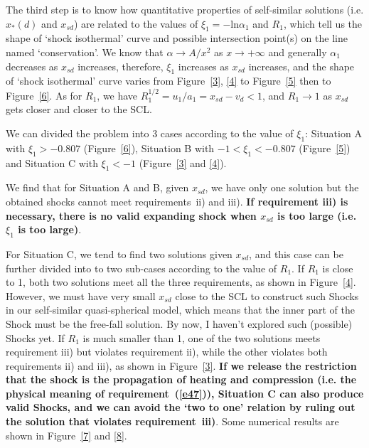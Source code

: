 \documentclass[fleqn,usenatbib]{mnras}
\begin{document}
The third step is to know how quantitative properties of self-similar solutions (i.e. $x_{*}(d)$ and $x_{sd}$) are related to the values of $\xi_{1}=-\mathrm{ln}\alpha_{1}$ and $R_{1}$, which tell us the shape of `shock isothermal' curve and possible intersection point(s) on the line named `conservation'. We know that $\alpha\rightarrow A/x^{2}$ as $x\rightarrow+\infty$ and generally $\alpha_{1}$ decreases as $x_{sd}$ increases, therefore, $\xi_{1}$ increases as $x_{sd}$ increases, and the shape of `shock isothermal' curve varies from Figure~\ref{3}, \ref{4} to Figure~\ref{5} then to Figure~\ref{6}. As for $R_{1}$, we have $R_{1}^{1/2}=u_{1}/a_{1}=x_{sd}-v_{d}<1$, and $R_{1}\rightarrow 1$ as $x_{sd}$ gets closer and closer to the SCL.

We can divided the problem into 3 cases according to the value of $\xi_{1}$: Situation A with $\xi_{1}>-0.807$ (Figure~\ref{6}), Situation B with $-1<\xi_{1}<-0.807$ (Figure~\ref{5}) and Situation C with $\xi_{1}<-1$ (Figure~\ref{3} and \ref{4}). 

We find that for Situation A and B, given $x_{sd}$, we have only one solution but the obtained shocks cannot meet requirements~ii) and iii). \textbf{If requirement iii) is necessary, there is no valid expanding shock when $x_{sd}$ is too large (i.e. $\xi_{1}$ is too large)}. 

For Situation C, we tend to find two solutions given $x_{sd}$, and this case can be further divided into to two sub-cases according to the value of $R_{1}$. If $R_{1}$ is close to 1, both two solutions meet all the three requirements, as shown in Figure~\ref{4}. However, we must have very small $x_{sd}$ close to the SCL to construct such Shocks in our self-similar quasi-spherical model, which means that the inner part of the Shock must be the free-fall solution. By now, I haven't explored such (possible) Shocks yet. If $R_{1}$ is much smaller than 1, one of the two solutions meets requirement iii) but violates requirement ii), while the other violates both requirements ii) and iii), as shown in Figure~\ref{3}. \textbf{If we release the restriction  that the shock is the propagation of heating and compression (i.e. the physical meaning of requirement~(\ref{e47})), Situation C can also produce valid Shocks, and we can avoid the `two to one' relation by ruling out the solution that violates requirement~iii)}. Some numerical results are shown in Figure~\ref{7} and \ref{8}.
\end{document}
